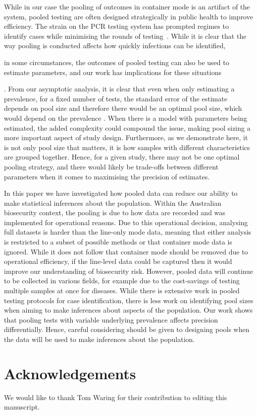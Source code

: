 \documentclass{article}
\newif\ifproofread
\newcommand{\rev}[1]{%
\ifproofread
\hl{#1}%
\else
#1%
\fi
}
\begin{document}
While in our case the pooling of outcomes in container mode is an artifact of the system, pooled testing are often designed strategically in public health to improve efficiency. The strain on the PCR testing system has prompted regimes to identify cases while minimising the rounds of testing~\citep{mutesa_pooled_2021}. While it is clear that the way pooling is conducted affects how quickly infections can be identified, \rev{in some circumstances, the outcomes of pooled testing can also be used to estimate parameters, and our work has implications for these situations} \citep{delaigle_nonparametric_2015, chatterjee_regression_2020, mcmahan_bayesian_2017, liu_generalized_2020}. From our asymptotic analysis, it is clear that even when only estimating a prevalence, for a fixed number of tests, the standard error of the estimate depends on pool size and therefore there would be an optimal pool size, which would depend on the prevalence  \citep{keeling2022modeling}. When there is a model with parameters being estimated, the added complexity could compound the issue, making pool sizing a more important aspect of study design. Furthermore, as we demonstrate here, it is not only pool size that matters, it is how samples with different characteristics are grouped together. Hence, for a given study, there may not be one optimal pooling strategy, and there would likely be trade-offs between different parameters when it comes to maximising the precision of estimates. 

\rev{In this paper we have investigated how pooled data can reduce our ability to make statistical inferences about the population. Within the Australian biosecurity context, the pooling is due to how data are recorded and was implemented for operational reasons. Due to this operational decision, analysing full datasets is harder than the line-only mode data, meaning that either analysis is restricted to a subset of possible methods or that container mode data is ignored. While it does not follow that container mode should be removed due to operational efficiency, if the line-level data could be captured then it would improve our understanding of biosecurity risk. 
However, pooled data will continue to be collected in various fields, for example due to the cost-savings of testing multiple samples at once for diseases.
While there is extensive work in pooled testing protocols for case identification, there is less work on identifying pool sizes when aiming to make inferences about aspects of the population.
Our work shows that pooling tests with variable underlying prevalence affects precision differentially. Hence, careful considering should be given to designing pools when the data will be used to make inferences about the population.}

\section{Acknowledgements}
We would like to thank Tom Waring for their contribution to editing this manuscript.

{}
%
\end{document}
